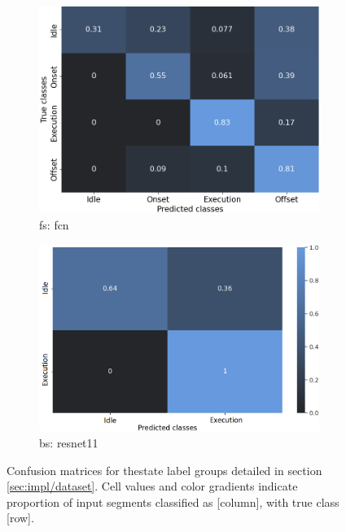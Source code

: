 \begin{figure}[h]
    \begin{subfigure}[b]{0.471\textwidth}
        \centering
        \includegraphics[width=\textwidth]{figures/res_FCN_fstate_cm.png}
        \caption{\acrshort{fs}: \acrlong{fcn}}
        \label{fig:res/conf_fstate}
    \end{subfigure}
    \begin{subfigure}[b]{0.529\textwidth}
        \centering
        \includegraphics[width=\textwidth]{figures/res_ResNet11_bstate_cm.png}
        \caption{\acrshort{bs}: \acrlong{resnet11}}
        \label{fig:res/conf_bstate}
    \end{subfigure}
    \caption{Confusion matrices for thestate label groups detailed in section \ref{sec:impl/dataset}. Cell values and color gradients indicate proportion of input segments classified as [column], with true class [row].}
    \label{fig:res/conf_state}
\end{figure}
\FloatBarrier

